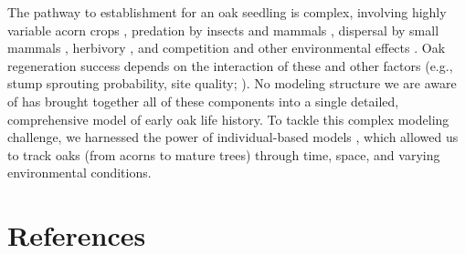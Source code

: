 \documentclass[
11pt, %
a4paper, %
oneside, %
headinclude,footinclude, %
]{scrartcl}
\begin{document}
The pathway to establishment for an oak seedling is complex, involving highly variable acorn crops \citep{Lusk2007, Kellner2014b}, predation by insects and mammals \citep{Bellocq2005, Lombardo2008, Kellner2014b}, dispersal by small mammals \citep{Moore2007,Kellner2016}, herbivory \citep{Kellner2017}, and competition and other environmental effects \citep{Kellner2016b}. Oak regeneration success depends on the interaction of these and other factors (e.g., stump sprouting probability, site quality; \citealp{Johnson2009}). No modeling structure we are aware of has brought together all of these components into a single detailed, comprehensive model of early oak life history. To tackle this complex modeling challenge, we harnessed the power of individual-based models \citep{Grimm2005}, which allowed us to track oaks (from acorns to mature trees) through time, space, and varying environmental conditions. 


\section{References}

\renewcommand{\bibsection}{}


\end{document}
